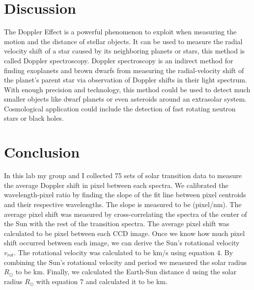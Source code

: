\documentclass[onecolumn, 12pt, a4paper]{article}
\begin{document}
\section{Discussion}
The Doppler Effect is a powerful phenomenon to exploit when measuring the motion and the distance of stellar objects. It can be used to measure the radial velocity shift of a star caused by its neighboring planets or stars, this method is called Doppler spectroscopy. Doppler spectroscopy is an indirect method for finding exoplanets and brown dwarfs from measuring the radial-velocity shift of the planet's parent star via observation of Doppler shifts in their light spectrum. With enough precision and technology, this method could be used to detect much smaller objects like dwarf planets or even asteroids around an extrasolar system. Cosmological application could include the detection of fast rotating neutron stars or black holes. 

\section{Conclusion}
In this lab my group and I collected 75 sets of solar transition data to measure the average Doppler shift in pixel between each spectra. We calibrated the wavelength-pixel ratio by finding the slope of the fit line between pixel centroids and their respective wavelengths. The slope is measured to be  (pixel/nm). The average pixel shift was measured by cross-correlating the spectra of the center of the Sun with the rest of the transition spectra. The average pixel shift was calculated to be  pixel between each CCD image. Once we know how much pixel shift occurred between each image, we can derive the Sun's rotational velocity $v_{rot}$. The rotational velocity was calculated to be  km/s using equation 4. By combining the Sun's rotational velocity and period we measured the solar radius $R_{\odot}$ to be  km. Finally, we calculated the Earth-Sun distance d using the solar radius $R_{\odot}$ with equation 7 and calculated it to be  km.
\end{document}
